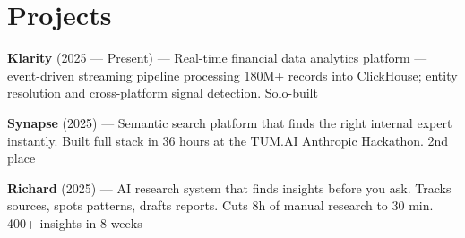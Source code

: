 \documentclass[a4paper,10pt]{article}
\begin{document}
\section{Projects}
\textbf{Klarity} {\small(2025 --- Present)} ---
Real-time financial data analytics platform --- event-driven streaming pipeline processing 180M+ records into ClickHouse; entity resolution and cross-platform signal detection. Solo-built

\vspace{2pt}
\textbf{Synapse} {\small(2025)} ---
Semantic search platform that finds the right internal expert instantly. Built full stack in 36 hours at the TUM.AI \texttimes{} Anthropic Hackathon. 2nd place

\vspace{2pt}
\textbf{Richard} {\small(2025)} ---
AI research system that finds insights before you ask. Tracks sources, spots patterns, drafts reports. Cuts 8h of manual research to 30 min. 400+ insights in 8 weeks
\end{document}
